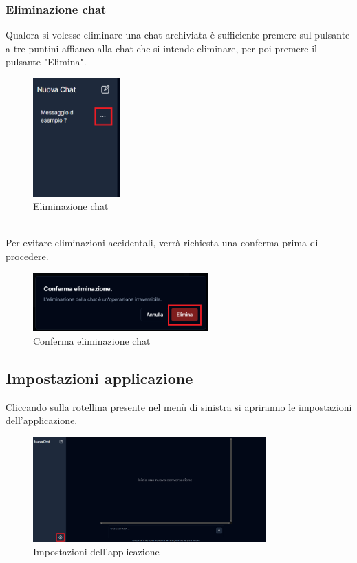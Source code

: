 \subsubsection{Eliminazione chat}
Qualora si volesse eliminare una chat archiviata è sufficiente premere sul pulsante a tre puntini affianco alla chat che si intende eliminare, per poi premere il pulsante "Elimina".
\begin{figure}[h!]
    \centering
    \includegraphics[width=0.3\textwidth]{deletechat.png}
    \caption{Eliminazione chat}\label{fig:deletechat}
\end{figure}
\\Per evitare eliminazioni accidentali, verrà richiesta una conferma prima di procedere.
\begin{figure}[h!]
    \centering
    \includegraphics[width=0.6\textwidth]{confirmdeletechat.png}
    \caption{Conferma eliminazione chat}\label{fig:confirmdeletechat}
\end{figure}

\newpage
\subsection{Impostazioni applicazione}
Cliccando sulla rotellina presente nel menù di sinistra si apriranno le impostazioni dell'applicazione.
\begin{figure}[h!]
    \centering
    \includegraphics[width=0.8\textwidth]{schermatachatsetting.png}
    \caption{Impostazioni dell'applicazione}\label{fig:settingchat}
\end{figure}
